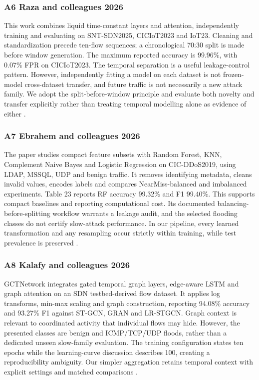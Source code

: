 \documentclass[conference]{IEEEtran}
\begin{document}
\subsubsection{A6 Raza and colleagues 2026}
This work combines liquid time-constant layers and attention, independently training and evaluating on SNT-SDN2025, CICIoT2023 and IoT23. Cleaning and standardization precede ten-flow sequences; a chronological 70:30 split is made before window generation. The maximum reported accuracy is 99.96\%, with 0.07\% FPR on CICIoT2023. The temporal separation is a useful leakage-control pattern. However, independently fitting a model on each dataset is not frozen-model cross-dataset transfer, and future traffic is not necessarily a new attack family. We adopt the split-before-window principle and evaluate both novelty and transfer explicitly rather than treating temporal modelling alone as evidence of either \cite{ref9}.

\subsubsection{A7 Ebrahem and colleagues 2026}
The paper studies compact feature subsets with Random Forest, KNN, Complement Naive Bayes and Logistic Regression on CIC-DDoS2019, using LDAP, MSSQL, UDP and benign traffic. It removes identifying metadata, cleans invalid values, encodes labels and compares NearMiss-balanced and imbalanced experiments. Table 23 reports RF accuracy 99.32\% and F1 99.40\%. This supports compact baselines and reporting computational cost. Its documented balancing-before-splitting workflow warrants a leakage audit, and the selected flooding classes do not certify slow-attack performance. In our pipeline, every learned transformation and any resampling occur strictly within training, while test prevalence is preserved \cite{ref10}.

\subsubsection{A8 Kalafy and colleagues 2026}
GCTNetwork integrates gated temporal graph layers, edge-aware LSTM and graph attention on an SDN testbed-derived flow dataset. It applies log transforms, min-max scaling and graph construction, reporting 94.08\% accuracy and 93.27\% F1 against ST-GCN, GRAN and LR-STGCN. Graph context is relevant to coordinated activity that individual flows may hide. However, the presented classes are benign and ICMP/TCP/UDP floods, rather than a dedicated unseen slow-family evaluation. The training configuration states ten epochs while the learning-curve discussion describes 100, creating a reproducibility ambiguity. Our simpler aggregation retains temporal context with explicit settings and matched comparisons \cite{ref11}.
\end{document}
